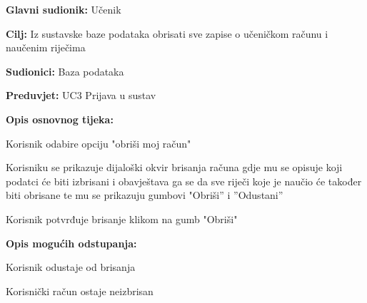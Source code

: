 \noindent {}
\begin{packed_item}

	\item \textbf{Glavni sudionik: } Učenik
	\item \textbf{Cilj: } Iz sustavske baze podataka obrisati sve zapise o 
	učeničkom računu i naučenim riječima
	\item \textbf{Sudionici: } Baza podataka
	\item \textbf{Preduvjet: } UC3 Prijava u sustav
	\item  \textbf{Opis osnovnog tijeka:} 
	
	\item[] \begin{packed_enum}

		\item Korisnik odabire opciju "obriši moj račun"
		\item Korisniku se prikazuje dijaloški okvir brisanja računa gdje mu se opisuje koji podatci će biti izbrisani i obavještava ga se da sve riječi koje je naučio će također biti obrisane te mu se prikazuju
		gumbovi "Obriši” i ”Odustani” 
		\item Korisnik potvrđuje brisanje klikom na gumb "Obriši"
	
	\end{packed_enum}

	\item  \textbf{Opis mogućih odstupanja:}
	
	\item[] \begin{packed_item}

		\item[3.a] Korisnik odustaje od brisanja
		\item[] \begin{packed_enum}
			
			\item Korisnički račun ostaje neizbrisan
			
		\end{packed_enum}
		
	\end{packed_item}

\end{packed_item}


